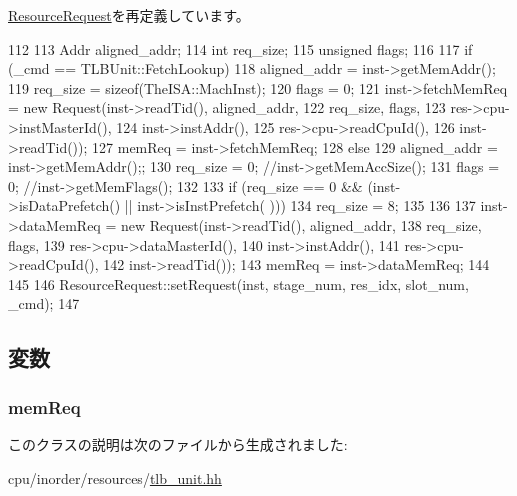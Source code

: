 \hyperlink{classResourceRequest_a119047fd563fe0c2e38e62dfb3be1dac}{ResourceRequest}を再定義しています。


\begin{DoxyCode}
112     {
113         Addr aligned_addr;
114         int req_size;
115         unsigned flags;
116 
117         if (_cmd == TLBUnit::FetchLookup) {
118             aligned_addr = inst->getMemAddr();
119             req_size = sizeof(TheISA::MachInst);
120             flags = 0;
121             inst->fetchMemReq = new Request(inst->readTid(), aligned_addr,
122                                             req_size, flags,
123                                             res->cpu->instMasterId(),
124                                             inst->instAddr(),
125                                             res->cpu->readCpuId(),
126                                             inst->readTid());
127             memReq = inst->fetchMemReq;
128         } else {
129             aligned_addr = inst->getMemAddr();;
130             req_size = 0; //inst->getMemAccSize();
131             flags = 0; //inst->getMemFlags();
132 
133             if (req_size == 0 && (inst->isDataPrefetch() || inst->isInstPrefetch(
      ))) {
134                 req_size = 8;
135             }
136 
137             inst->dataMemReq = new Request(inst->readTid(), aligned_addr,
138                                            req_size, flags,
139                                            res->cpu->dataMasterId(),
140                                            inst->instAddr(),
141                                            res->cpu->readCpuId(),
142                                            inst->readTid());
143             memReq = inst->dataMemReq;
144         }
145 
146         ResourceRequest::setRequest(inst, stage_num, res_idx, slot_num, _cmd);
147     }
\end{DoxyCode}


\subsection{変数}
\hypertarget{classTLBUnitRequest_a5520eb2f7c2cf4b0e109d6ffd6d2d053}{
\subsubsection[{memReq}]{ {\bf memReq}}}
\label{classTLBUnitRequest_a5520eb2f7c2cf4b0e109d6ffd6d2d053}


このクラスの説明は次のファイルから生成されました:\begin{DoxyCompactItemize}
\item 
cpu/inorder/resources/\hyperlink{tlb__unit_8hh}{tlb\_\-unit.hh}\end{DoxyCompactItemize}
